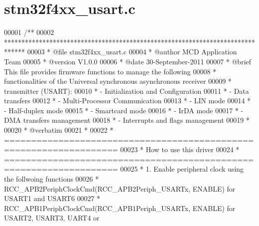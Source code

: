 \section{stm32f4xx\+\_\+usart.\+c}
\label{stm32f4xx__usart_8c_source}

\begin{DoxyCode}
00001 \textcolor{comment}{/**}
00002 \textcolor{comment}{  ******************************************************************************}
00003 \textcolor{comment}{  * @file    stm32f4xx\_usart.c}
00004 \textcolor{comment}{  * @author  MCD Application Team}
00005 \textcolor{comment}{  * @version V1.0.0}
00006 \textcolor{comment}{  * @date    30-September-2011}
00007 \textcolor{comment}{  * @brief   This file provides firmware functions to manage the following }
00008 \textcolor{comment}{  *          functionalities of the Universal synchronous asynchronous receiver}
00009 \textcolor{comment}{  *          transmitter (USART):           }
00010 \textcolor{comment}{  *           - Initialization and Configuration}
00011 \textcolor{comment}{  *           - Data transfers}
00012 \textcolor{comment}{  *           - Multi-Processor Communication}
00013 \textcolor{comment}{  *           - LIN mode}
00014 \textcolor{comment}{  *           - Half-duplex mode}
00015 \textcolor{comment}{  *           - Smartcard mode}
00016 \textcolor{comment}{  *           - IrDA mode}
00017 \textcolor{comment}{  *           - DMA transfers management}
00018 \textcolor{comment}{  *           - Interrupts and flags management }
00019 \textcolor{comment}{  *           }
00020 \textcolor{comment}{  *  @verbatim}
00021 \textcolor{comment}{  *      }
00022 \textcolor{comment}{  *          ===================================================================}
00023 \textcolor{comment}{  *                                 How to use this driver}
00024 \textcolor{comment}{  *          ===================================================================}
00025 \textcolor{comment}{  *          1. Enable peripheral clock using the follwoing functions}
00026 \textcolor{comment}{  *             RCC\_APB2PeriphClockCmd(RCC\_APB2Periph\_USARTx, ENABLE) for USART1 and USART6 }
00027 \textcolor{comment}{  *             RCC\_APB1PeriphClockCmd(RCC\_APB1Periph\_USARTx, ENABLE) for USART2, USART3, UART4 or
}
\end{DoxyCode}

